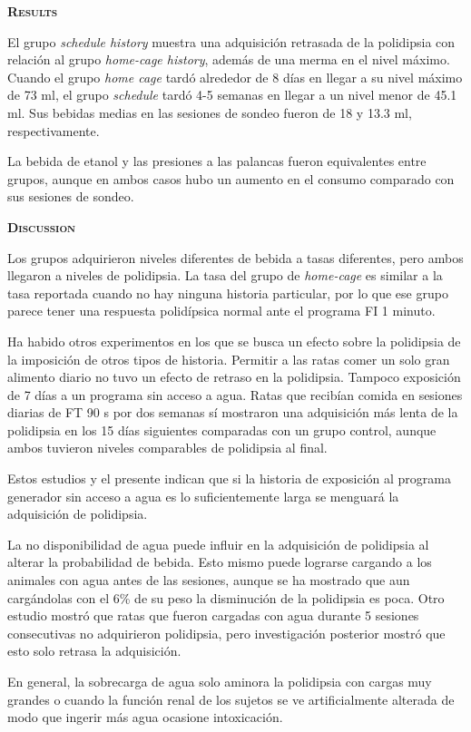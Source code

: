 \documentclass[a4paper,12pt]{article}
\begin{document}
{\scshape\bfseries Results}

El grupo {\itshape schedule history} muestra una adquisición retrasada de la polidipsia con relación al grupo {\itshape home-cage history}, además de una merma en el nivel máximo. Cuando el grupo {\itshape home cage} tardó alrededor de 8 días en llegar a su nivel máximo de 73 ml, el grupo {\itshape schedule} tardó 4-5 semanas en llegar a un nivel menor de 45.1 ml. Sus bebidas medias en las sesiones de sondeo fueron de 18 y 13.3 ml, respectivamente.

La bebida de etanol y las presiones a las palancas fueron equivalentes entre grupos, aunque en ambos casos hubo un aumento en el consumo comparado con sus sesiones de sondeo.

{\scshape\bfseries Discussion}

Los grupos adquirieron niveles diferentes de bebida a tasas diferentes, pero ambos llegaron a niveles de polidipsia. La tasa del grupo de {\itshape home-cage} es similar a la tasa reportada cuando no hay ninguna historia particular, por lo que ese grupo parece tener una respuesta polidípsica normal ante el programa FI 1 minuto.

Ha habido otros experimentos en los que se busca un efecto sobre la polidipsia de la imposición de otros tipos de historia. Permitir a las ratas comer un solo gran alimento diario no tuvo un efecto de retraso en la polidipsia. Tampoco exposición de 7 días a un programa sin acceso a agua. Ratas que recibían comida en sesiones diarias de FT 90 s por dos semanas sí mostraron una adquisición más lenta de la polidipsia en los 15 días siguientes comparadas con un grupo control, aunque ambos tuvieron niveles comparables de polidipsia al final.

Estos estudios y el presente indican que si la historia de exposición al programa generador sin acceso a agua es lo suficientemente larga se menguará la adquisición de polidipsia.

La no disponibilidad de agua puede influir en la adquisición de polidipsia al alterar la probabilidad de bebida. Esto mismo puede lograrse cargando a los animales con agua antes de las sesiones, aunque se ha mostrado que aun cargándolas con el 6\% de su peso la disminución de la polidipsia es poca. Otro estudio mostró que ratas que fueron cargadas con agua durante 5 sesiones consecutivas no adquirieron polidipsia, pero investigación posterior mostró que esto solo retrasa la adquisición.

En general, la sobrecarga de agua solo aminora la polidipsia con cargas muy grandes o cuando la función renal de los sujetos se ve artificialmente alterada de modo que ingerir más agua ocasione intoxicación.
\end{document}
